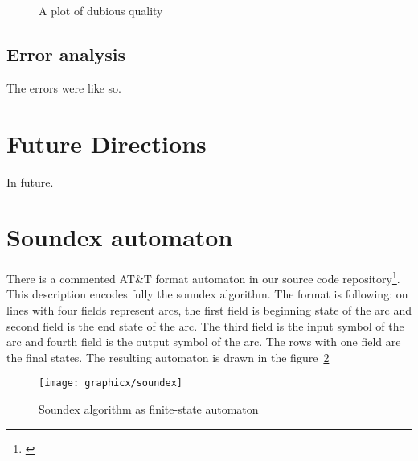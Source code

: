\documentclass[a4paper,12pt]{article}
\begin{document}
\begin{figure}
    \centering
    \caption{A plot of dubious quality
    \label{fig:optimisation-speed-quality}}
\end{figure}

\subsection{Error analysis}
\label{subsec:error-analysis}

The errors were like so.


\section{Future Directions}
\label{sec:future}

In future.



\section*{Soundex automaton}
\label{appendix:soundex}

There is a commented AT\&T format automaton in our source code
repository\footnote{\url{}}. This description encodes fully the soundex
algorithm.  The format is following: on lines with four fields represent arcs,
the first field is beginning state of the arc and second field is the end state
of the arc. The third field is the input symbol of the arc and fourth field is
the output symbol of the arc. The rows with one field are the final states. The
resulting automaton is drawn in the figure~\ref{fig:soundex}

\begin{figure}
    \centering
    \texttt{[image: graphicx/soundex]}
    \caption{Soundex algorithm as finite-state automaton
    \label{fig:soundex}}
\end{figure}
\end{document}
